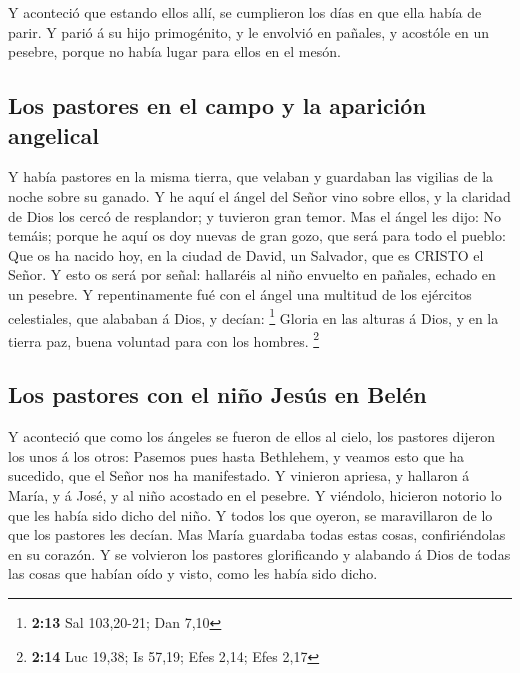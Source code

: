  Y aconteció que estando ellos allí, se cumplieron los días
en que ella había de parir.  Y parió á su hijo primogénito,
y le envolvió en pañales, y acostóle en un pesebre, porque no había
lugar para ellos en el mesón.

\hypertarget{los-pastores-en-el-campo-y-la-apariciuxf3n-angelical}{%
\subsection{Los pastores en el campo y la aparición
angelical}\label{los-pastores-en-el-campo-y-la-apariciuxf3n-angelical}}

 Y había pastores en la misma tierra, que velaban y
guardaban las vigilias de la noche sobre su ganado.  Y he
aquí el ángel del Señor vino sobre ellos, y la claridad de Dios los
cercó de resplandor; y tuvieron gran temor.  Mas el ángel
les dijo: No temáis; porque he aquí os doy nuevas de gran gozo, que será
para todo el pueblo:  Que os ha nacido hoy, en la ciudad de
David, un Salvador, que es CRISTO el Señor.  Y esto os será
por señal: hallaréis al niño envuelto en pañales, echado en un pesebre.
 Y repentinamente fué con el ángel una multitud de los
ejércitos celestiales, que alababan á Dios, y decían: \footnote{\textbf{2:13}
  Sal 103,20-21; Dan 7,10}  Gloria en las alturas á Dios, y
en la tierra paz, buena voluntad para con los hombres. \footnote{\textbf{2:14}
  Luc 19,38; Is 57,19; Efes 2,14; Efes 2,17}

\hypertarget{los-pastores-con-el-niuxf1o-jesuxfas-en-beluxe9n}{%
\subsection{Los pastores con el niño Jesús en
Belén}\label{los-pastores-con-el-niuxf1o-jesuxfas-en-beluxe9n}}

 Y aconteció que como los ángeles se fueron de ellos al
cielo, los pastores dijeron los unos á los otros: Pasemos pues hasta
Bethlehem, y veamos esto que ha sucedido, que el Señor nos ha
manifestado.  Y vinieron apriesa, y hallaron á María, y á
José, y al niño acostado en el pesebre.  Y viéndolo,
hicieron notorio lo que les había sido dicho del niño.  Y
todos los que oyeron, se maravillaron de lo que los pastores les decían.
 Mas María guardaba todas estas cosas, confiriéndolas en su
corazón.  Y se volvieron los pastores glorificando y
alabando á Dios de todas las cosas que habían oído y visto, como les
había sido dicho.

